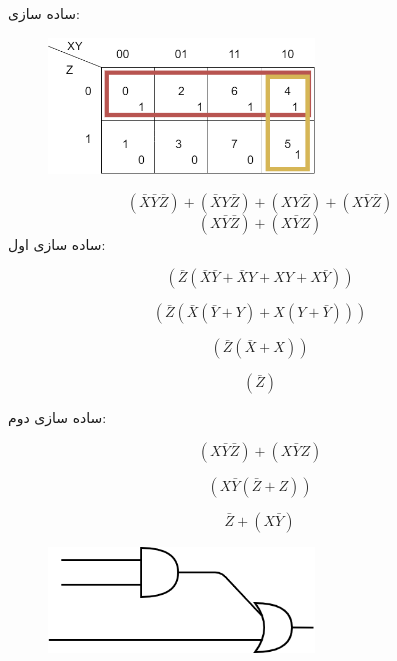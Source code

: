 \documentclass[20pt, a4paper]{article}
\begin{document}
ساده سازی:

\begin{figure}[htbp]\centering
	\centerline{\includegraphics[width=200pt]{img/karnoughMap/k4-2.png}}
\end{figure}

\begin{equation}
	(\bar{X}\bar{Y}\bar{Z})+(\bar{X}Y\bar{Z})+(XY\bar{Z})+ (X\bar{Y}\bar{Z}) 
\end{equation}
\begin{equation}
	(X\bar{Y}\bar{Z})+(X\bar{Y}Z) 
\end{equation}
ساده سازی اول:

\begin{equation}
	(\bar{Z}(\bar{X}\bar{Y}+\bar{X}Y+XY+X\bar{Y}))
\end{equation}

\begin{equation}
	(\bar{Z}(\bar{X}(\bar{Y}+Y)+X(Y+\bar{Y})))
\end{equation}

\begin{equation}
	(\bar{Z}(\bar{X}+X))
\end{equation}

\begin{equation}
	(\bar{Z})
\end{equation}


ساده سازی دوم:

\begin{equation}
	(X\bar{Y}\bar{Z})+(X\bar{Y}Z)
\end{equation}

\begin{equation}
	(X\bar{Y}(\bar{Z}+Z))
\end{equation}

\begin{equation}
	\bar{Z} + (X\bar{Y})
\end{equation}


\begin{figure}[htbp]\centering
	\centerline{\includegraphics[width=200pt]{img/karnoughMap/k4-2-1.png}}
\end{figure}
\end{document}
